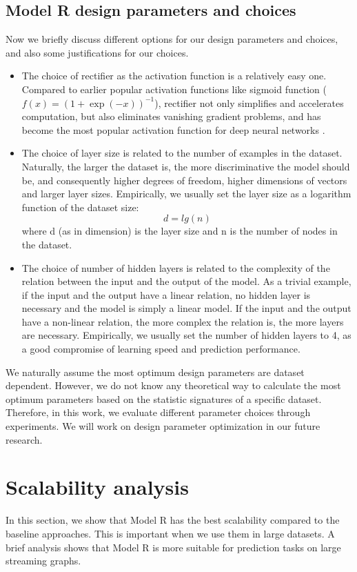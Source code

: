 \documentclass[12pt]{WSUThesis}
\theoremstyle{definition}
\begin{document}
\subsection{Model R design parameters and choices}
Now we briefly discuss different options for our design parameters and choices,
and also some justifications for our choices.
\begin{itemize}
	\item The choice of rectifier as the activation function is a relatively easy one.
	Compared to earlier popular activation functions like sigmoid function
	($ f(x) = (1 + \exp(-x))^{-1} $),
	rectifier not only simplifies and accelerates computation,
	but also eliminates vanishing gradient problems,
	and has become the most popular activation function
	for deep neural networks \cite{lecun2015deep}.
	\item The choice of layer size is related to
	the number of examples in the dataset.
	Naturally, the larger the dataset is,
	the more discriminative the model should be,
	and consequently higher degrees of freedom,
	higher dimensions of vectors and larger layer sizes.
	Empirically, we usually set the layer size as a logarithm function of the dataset size:
	\[d = lg(n)\]
	where d (as in dimension) is the layer size and n is the number of nodes in the dataset.
	\item The choice of number of hidden layers is related to the complexity of the relation between the input and the output of the model.
	As a trivial example, if the input and the output have a linear relation,
	no hidden layer is necessary and the model is simply a linear model.
	If the input and the output have a non-linear relation,
	the more complex the relation is, the more layers are necessary.
	Empirically, we usually set the number of hidden layers to 4,
	as a good compromise of learning speed and prediction performance.
\end{itemize}
We naturally assume the most optimum design parameters are dataset dependent.
However, we do not know any theoretical way to calculate the most optimum parameters based on the statistic signatures of a specific dataset.
Therefore, in this work, we evaluate different parameter choices through experiments.
We will work on design parameter optimization in our future research.

\section{Scalability analysis}
In this section, we show that Model R has the best scalability compared to the baseline approaches. This is important when we use them in large datasets. A brief analysis shows that Model R is more suitable for prediction tasks on large streaming graphs.
\end{document}
